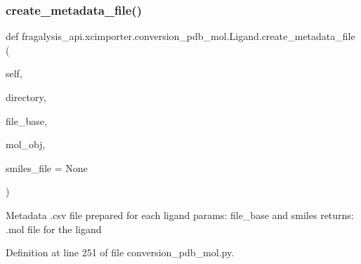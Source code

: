 \subsubsection{\texorpdfstring{create\+\_\+metadata\+\_\+file()}{create\_metadata\_file()}}
{\footnotesize\ttfamily def fragalysis\+\_\+api.\+xcimporter.\+conversion\+\_\+pdb\+\_\+mol.\+Ligand.\+create\+\_\+metadata\+\_\+file (\begin{DoxyParamCaption}\item[{}]{self,  }\item[{}]{directory,  }\item[{}]{file\+\_\+base,  }\item[{}]{mol\+\_\+obj,  }\item[{}]{smiles\+\_\+file = {\ttfamily None} }\end{DoxyParamCaption})}

\begin{DoxyVerb}Metadata .csv file prepared for each ligand
params: file_base and smiles
returns: .mol file for the ligand
\end{DoxyVerb}
 

Definition at line 251 of file conversion\+\_\+pdb\+\_\+mol.\+py.


